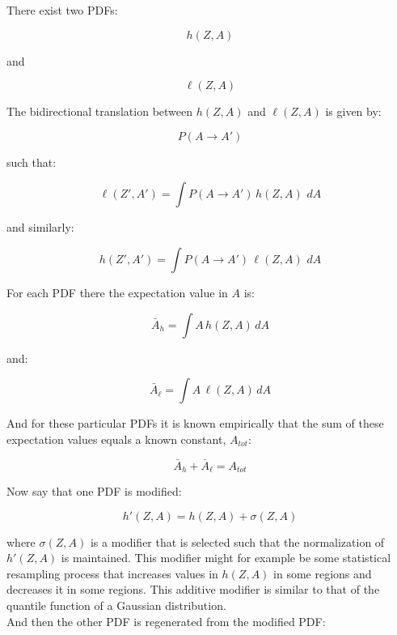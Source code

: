 \documentclass{article}
\begin{document}
\setlength{\parindent}{0pt}

There exist two PDFs:

\[ h(Z,A) \]

and 

\[ \ell(Z,A) \]

The bidirectional translation between $h(Z,A)$ and $\ell(Z,A)$ is given by:

\[ P(A \rightarrow A') \]

such that:

\begin{equation}
\ell(Z',A') = \int P(A \rightarrow A')\, h(Z,A)\,\, dA
\end{equation}

and similarly:

\begin{equation}
h(Z',A') = \int P(A \rightarrow A')\, \ell(Z,A)\,\, dA
\end{equation}

For each PDF there the expectation value in $A$ is: 

\begin{equation}
\bar{A}_h = \int A\, h(Z,A)\, dA
\end{equation}

and:

\begin{equation}
\bar{A}_\ell = \int A\, \ell(Z,A)\, dA
\end{equation}

And for these particular PDFs it is known empirically that the sum of these expectation values equals a known constant, $A_{tot}$:

\begin{equation}
\bar{A}_{h} + \bar{A}_{\ell} = A_{tot}
\end{equation}

Now say that one PDF is modified:

\begin{equation}
h'(Z,A) = h(Z,A) + \sigma(Z,A)
\end{equation}

where $\sigma(Z,A)$ is a modifier that is selected such that the normalization of $h'(Z,A)$ is maintained. This modifier might for example be some statistical resampling process that increases values in $h(Z,A)$ in some regions and decreases it in some regions. This additive modifier is similar to that of the quantile function of a Gaussian distribution. \\

And then the other PDF is regenerated from the modified PDF: 
\end{document}

